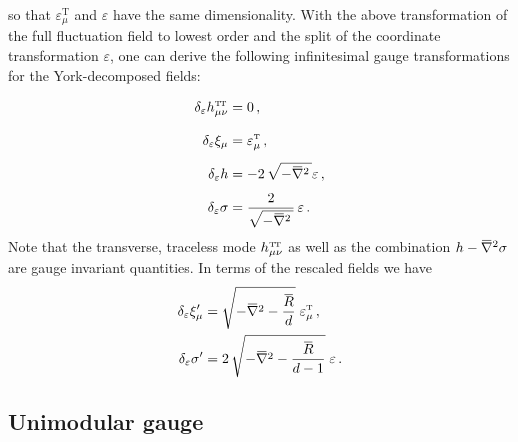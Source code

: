 \documentclass[11pt]{book}
\newcommand{\overbar}[1]{\mkern 1.5mu\overline{\mkern-1.5mu#1\mkern-1.5mu}\mkern 1.5mu}
\newcommand\TTspace{ -1pt }
\newcommand\hTTmunu{ h^{\scriptscriptstyle{\mathrm{T\hspace{\TTspace}T}}}_{\mu\nu} }
\newcommand{\bnabla}{\overbar \nabla}
\newcommand{\bR}{\overbar R}
\numberwithin{equation}{chapter}
\begin{document}
\begin{appendices}
so that
$\varepsilon^{\scriptscriptstyle \mathrm T}_\mu$
and $\varepsilon$ have the same dimensionality.
With the above transformation of the full fluctuation field
to lowest order and the split of the coordinate transformation
$\varepsilon$, one can derive the following infinitesimal
gauge transformations for the York-decomposed fields:
\begin{align}
  \delta_\varepsilon \hTTmunu &= \vphantom{\frac 12} 0 \,, \\
  \delta_\varepsilon \xi_\mu  &= \vphantom{\frac 12} \varepsilon^{\scriptscriptstyle \mathrm T}_\mu \,, \\
  \delta_\varepsilon h        &=  -2 \, \vphantom{\frac 12} \sqrt{- \bnabla^2 \,} \varepsilon \,, \\
  \delta_\varepsilon \sigma   &= \frac{2}{\sqrt{- \bnabla^2 \,}} \, \varepsilon \,.
\end{align}
Note that the transverse, traceless mode $\hTTmunu$ as well as the combination
$h - \bnabla^2 \sigma$ are gauge invariant quantities.
In terms of the rescaled fields we have
\begin{align}
  \delta_\varepsilon \xi^\prime_\mu  &= \sqrt{-\bnabla^2 - \frac{\bR}{d}} \; \varepsilon^{\scriptscriptstyle \mathrm T}_\mu \,, \\
  \delta_\varepsilon \sigma^\prime   &= 2 \, \sqrt{-\bnabla^2 - \frac{\bR}{d-1}} \; \varepsilon \,.
\end{align}


\subsection{Unimodular gauge}


\end{appendices}
\end{document}
